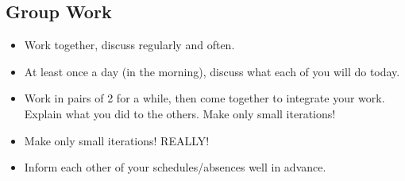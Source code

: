 \subsection{Group Work}
	\begin{itemize}
	\item Work together, discuss regularly and often.
	\item At least once a day (in the morning), discuss what each of you will do today.
	\item Work in pairs of 2 for a while, then come together to integrate your work. Explain what you did to the others. Make only small iterations!
	\item Make only small iterations! REALLY!
	\item Inform each other of your schedules/absences well in advance.
	\end{itemize}